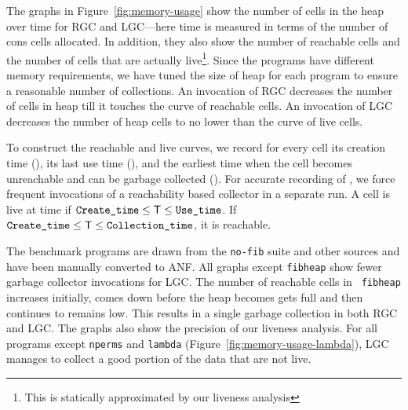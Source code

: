 \documentclass[9pt]{sigplanconf}
\begin{document}
\begin{enumerate}
The graphs  in Figure~\ref{fig:memory-usage} show the  number of cells
in the heap over time for RGC and LGC---here time is measured in terms
of the number of cons cells allocated. In addition, they also show the
number of  reachable cells and the  number of cells  that are actually
live\footnote{This   is  statically   approximated  by   our  liveness
  analysis}.  Since  the programs have  different memory requirements,
we have tuned the size of heap for each program to ensure a reasonable
number of  collections. An invocation  of RGC decreases the  number of
cells  in heap  till  it touches  the  curve of  reachable cells.   An
invocation of LGC decreases the number  of heap cells to no lower than
the curve of live cells.

To construct the  reachable and live curves, we  record for every cell
its creation time (\CreateTime), its last use time (\UseTime), and the
earliest time  when the  cell becomes unreachable  and can  be garbage
collected (\CollTime).  For accurate recording of  \CollTime, we force
frequent invocations  of a reachability based collector  in a separate
run.     A    cell   is    live    at    time   \mbox{\exectime}    if
\mbox{$\mbox{{\tt Create\_time}}       \leq       \mbox{\mbox{\sf T}}       \leq
  \mbox{{\tt Use\_time}}$}.       If      \mbox{$\mbox{{\tt Create\_time}}      \leq
  \mbox{\mbox{\sf T}} \leq \mbox{{\tt Collection\_time}}$}, it is reachable.

The benchmark programs are drawn from the {\tt no-fib} suite and other
sources and have been  manually converted to  ANF.  All  graphs  except  {\tt  fibheap}  show  fewer  garbage
collector  invocations for  LGC. The  number  of reachable  cells in  {\tt
  fibheap} increases  initially, comes  down before the  heap becomes gets
full and then  continues to remains low.  This results in  a single garbage
collection in both RGC and LGC.  The graphs also show the precision of
our liveness analysis.  For  all programs  except  {\tt nperms} and
{\tt lambda} (Figure~\ref{fig:memory-usage-lambda}),  LGC
manages to collect a good portion of the data that are not live.


\end{enumerate}
\end{document}
